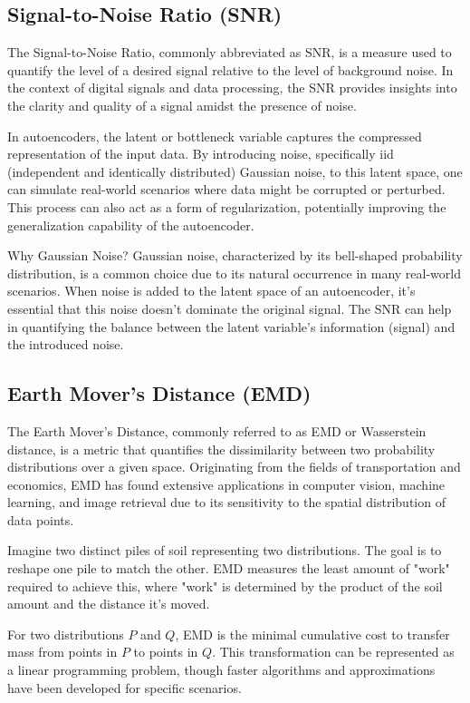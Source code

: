\documentclass{article}
\begin{document}
\subsection{Signal-to-Noise Ratio (SNR)}
\label{ssec:snr}

The Signal-to-Noise Ratio, commonly abbreviated as SNR, is a measure used to quantify the level of a desired signal relative to the level of background noise. 
In the context of digital signals and data processing, the SNR provides insights into the clarity and quality of a signal amidst the presence of noise.

In autoencoders, the latent or bottleneck variable captures the compressed representation of the input data. By introducing noise, specifically iid (independent and identically distributed) Gaussian noise, to this latent space, one can simulate real-world scenarios where data might be corrupted or perturbed. This process can also act as a form of regularization, potentially improving the generalization capability of the autoencoder.

Why Gaussian Noise? 
Gaussian noise, characterized by its bell-shaped probability distribution, is a common choice due to its natural occurrence in many real-world scenarios. When noise is added to the latent space of an autoencoder, it's essential that this noise doesn't dominate the original signal. The SNR can help in quantifying the balance between the latent variable's information (signal) and the introduced noise.

\subsection{Earth Mover's Distance (EMD)}
\label{ssec:emd}

The Earth Mover's Distance, commonly referred to as EMD or Wasserstein distance, is a metric that quantifies the dissimilarity between two probability distributions over a given space. Originating from the fields of transportation and economics, EMD has found extensive applications in computer vision, machine learning, and image retrieval due to its sensitivity to the spatial distribution of data points.

Imagine two distinct piles of soil representing two distributions. The goal is to reshape one pile to match the other. EMD measures the least amount of "work" required to achieve this, where "work" is determined by the product of the soil amount and the distance it's moved.

For two distributions 
$P$ and 
$Q$, EMD is the minimal cumulative cost to transfer mass from points in 
$P$ to points in 
$Q$. This transformation can be represented as a linear programming problem, though faster algorithms and approximations have been developed for specific scenarios.
\end{document}

